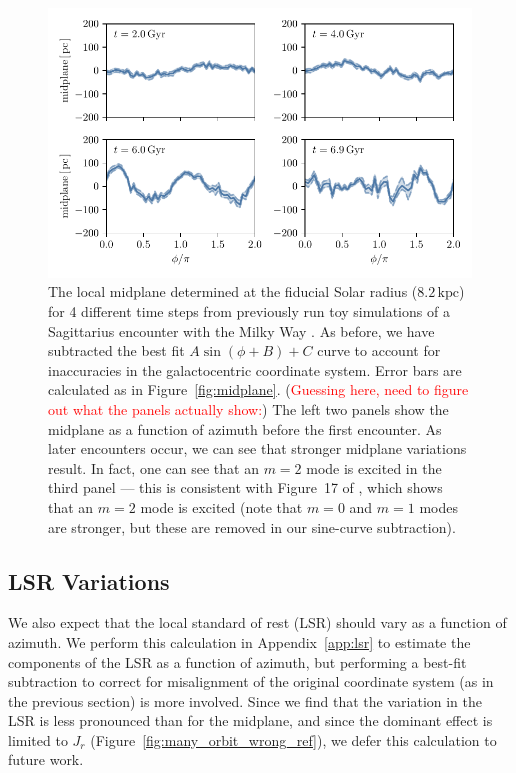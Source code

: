 \documentclass[twocolumn]{aastex62}
\newcommand{\Gus}[1]{\textcolor{red}{#1}}
\newcommand{\kpc}{\text{kpc}}
\begin{document}
\begin{figure}
\begin{center}
\includegraphics[width=5.5in]{fig/midplane_fit_chervinsim.pdf}
\end{center}
\caption{The local midplane determined at the fiducial Solar radius
($8.2\,\kpc$) for 4 different time steps from previously run toy simulations
of a Sagittarius encounter with the Milky Way \citep{2018MNRAS.481..286L}. As
before, we have subtracted the best fit $A\sin{(\phi+B)}+C$ curve to account
for inaccuracies in the galactocentric coordinate system. Error bars are
calculated as in Figure~\ref{fig:midplane}. (\Gus{Guessing here, need to
figure out what the panels actually show:}) The left two panels show the
midplane as a function of azimuth before the first encounter. As later
encounters occur, we can see that stronger midplane variations result. In
fact, one can see that an $m=2$ mode is excited in the third panel --- this is
consistent with Figure~17 of \citet{2018MNRAS.481..286L}, which shows that an
$m=2$ mode is excited (note that $m=0$ and $m=1$ modes are stronger, but these
are removed in our sine-curve subtraction).}
\label{fig:midplane_chervin}
\end{figure}

\subsection{LSR Variations} \label{ssec:lsr_var}
We also expect that the local standard of rest (LSR) should vary as a function
of azimuth. We perform this calculation in Appendix~\ref{app:lsr} to estimate
the components of the LSR as a function of azimuth, but performing a best-fit
subtraction to correct for misalignment of the original coordinate system (as
in the previous section) is more involved. Since we find that the variation in
the LSR is less pronounced than for the midplane, and since the dominant
effect is limited to $J_r$ (Figure~\ref{fig:many_orbit_wrong_ref}), we defer
this calculation to future work.
\end{document}
